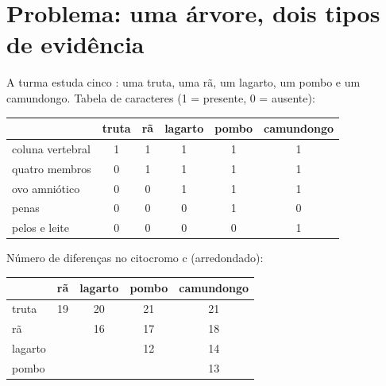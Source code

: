 \section{Problema: uma árvore, dois tipos de evidência}

\begin{problem}
\label{pb:g10:common-ancestry:1}
A turma estuda cinco : uma truta, uma rã, um lagarto, um pombo
e um camundongo. Tabela de caracteres (1 = presente, 0 = ausente):

\begin{center}
\begin{tabular}{lccccc}
 & truta & rã & lagarto & pombo & camundongo \\ \hline
coluna vertebral & 1 & 1 & 1 & 1 & 1 \\
quatro membros & 0 & 1 & 1 & 1 & 1 \\
ovo amniótico & 0 & 0 & 1 & 1 & 1 \\
penas & 0 & 0 & 0 & 1 & 0 \\
pelos e leite & 0 & 0 & 0 & 0 & 1 \\
\end{tabular}
\end{center}

Número de diferenças no citocromo c (arredondado):

\begin{center}
\begin{tabular}{lcccc}
 & rã & lagarto & pombo & camundongo \\ \hline
truta & 19 & 20 & 21 & 21 \\
rã & & 16 & 17 & 18 \\
lagarto & & & 12 & 14 \\
pombo & & & & 13 \\
\end{tabular}
\end{center}


\end{problem}
